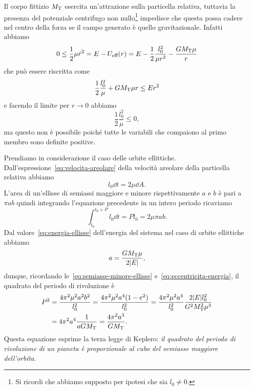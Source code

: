 {Il corpo fittizio $M_\textup{T}$ esercita un'attrazione sulla particella
relativa, tuttavia la presenza del potenziale centrifugo non
nullo\footnote{Si ricordi che abbiamo supposto per ipotesi che sia $l_0\neq 0$.}
impedisce che questa possa cadere nel centro della forza se il campo generato è
quello gravitazionale. Infatti abbiamo
\begin{equation}
  0\leq \frac{1}{2}\mu\dot{r}^2 = E - U_\textup{eff}(r) = E -
  \frac{1}{2}\frac{l_0^2}{\mu r^2} - \frac{GM_\textup{T}\mu}{r}
\end{equation}
che può essere riscritta come
\begin{equation}
  \frac{1}{2}\frac{l_0^2}{\mu} + GM_\textup{T}\mu r \leq Er^2
\end{equation}
e facendo il limite per $r \to 0$ abbiamo
\begin{equation}
  \frac{1}{2}\frac{l_0^2}{\mu} \leq 0,
\end{equation}
ma questo non è possibile poiché tutte le variabili che compaiono al primo
membro sono definite positive.

Prendiamo in considerazione il caso delle orbite
ellittiche. Dall'espressione~\eqref{eq:velocita-areolare} della velocità
areolare della particella relativa abbiamo
\begin{equation}
  l_0 \dd t = 2\mu\dd A.
\end{equation}
L'area di un'ellisse di semiassi maggiore e minore rispettivamente $a$ e $b$ è
pari a $\pi ab$ quindi integrando l'equazione precedente in un intero periodo
ricaviamo
\begin{equation}
    \int_{t_0}^{t_0+P} l_0\dd t = Pl_0 = 2\mu\pi ab.
\end{equation}
Dal valore~\eqref{eq:energia-ellisse} dell'energia del sistema nel caso di
orbite ellittiche abbiamo
\begin{equation}
  a = \frac{GM_\textup{T}\mu}{2\lvert E\rvert},
\end{equation}
dunque, ricordando le~\eqref{eq:semiasse-minore-ellisse}
e~\eqref{eq:eccentricita-energia}, il quadrato del periodo di rivoluzione è
\begin{equation}
  \label{eq:terza-legge-keplero}
  \begin{split}
    P^2 &= \frac{4\pi^2\mu^2a^2b^2}{l_0^2} = \frac{4\pi^2\mu^2a^4(1-e^2)}{l_0^2}
    = \frac{4\pi^2\mu^2a^4}{l_0^2}\frac{2\lvert E\rvert l_0^2}{G^2M_\textup{T}^2\mu^3} \\
    &= 4\pi^2a^4\frac{1}{aGM_\textup{T}} = \frac{4\pi^2a^3}{GM_\textup{T}}.
  \end{split}
\end{equation}
Questa equazione esprime la terza legge di Keplero: \emph{il quadrato del
  periodo di rivoluzione di un pianeta è proporzionale al cubo del semiasse
  maggiore dell'orbita}.

}
